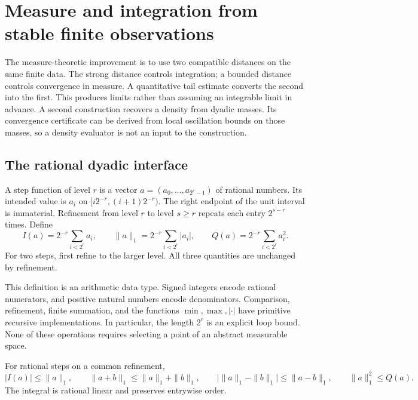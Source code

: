 \section{Measure and integration from stable finite observations}
\label{sec:measure}

The measure-theoretic improvement is to use two compatible distances on the
same finite data.  The strong distance controls integration; a bounded
distance controls convergence in measure.  A quantitative tail estimate
converts the second into the first.  This produces limits rather than
assuming an integrable limit in advance.  A second construction recovers a
density from dyadic masses.  Its convergence certificate can be derived from
local oscillation bounds on those masses, so a density evaluator is not an
input to the construction.

\subsection{The rational dyadic interface}

\begin{definition}\label{m:step}
A step function of level \(r\) is a vector
\(a=(a_0,\ldots,a_{2^r-1})\) of rational numbers.  Its intended value is
\(a_i\) on \([i2^{-r},(i+1)2^{-r})\).  The right endpoint of the unit interval
is immaterial.  Refinement from level \(r\) to level \(s\ge r\) repeats each
entry \(2^{s-r}\) times.  Define
\[
 I(a)=2^{-r}\sum_{i<2^r}a_i,\qquad
 \|a\|_1=2^{-r}\sum_{i<2^r}|a_i|,\qquad
 Q(a)=2^{-r}\sum_{i<2^r}a_i^2.
\]
For two steps, first refine to the larger level.  All three quantities are
unchanged by refinement.
\end{definition}

This definition is an arithmetic data type.  Signed integers encode rational
numerators, and positive natural numbers encode denominators.  Comparison,
refinement, finite summation, and the functions
\(\min,\max,|\cdot|\) have primitive recursive implementations.  In
particular, the length \(2^r\) is an explicit loop bound.  None of these
operations requires selecting a point of an abstract measurable space.

\begin{lemma}\label{m:finite}
For rational steps on a common refinement,
\[
 |I(a)|\le\|a\|_1,\qquad
 \|a+b\|_1\le\|a\|_1+\|b\|_1,\qquad
 \bigl|\|a\|_1-\|b\|_1\bigr|\le\|a-b\|_1,
 \qquad
 \|a\|_1^2\le Q(a).
\]
The integral is rational linear and preserves entrywise order.
\end{lemma}

